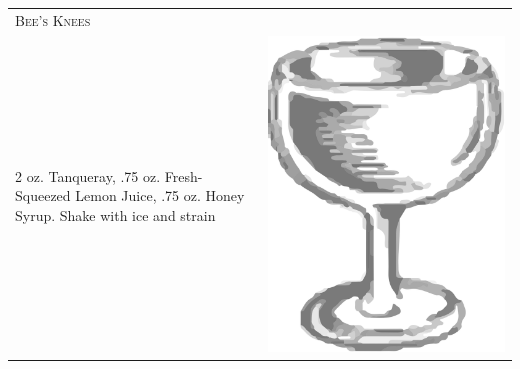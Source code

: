 \documentclass{article}
\begin{document}
\begin{multicols}{2}
\begin{tabular}{p{2in} p{0.5in}}
\multicolumn{2}{p{3in}}{\centering\Huge\textsc{Bee's Knees}}\\ 
  \vspace{-0.1in}2 oz. Tanqueray, .75 oz. Fresh-Squeezed Lemon Juice, .75 oz. Honey Syrup. Shake with ice and strain&
  \vspace{-0.1in} \includegraphics{coupe.png}
\end{tabular}


\end{multicols}
\end{document}
